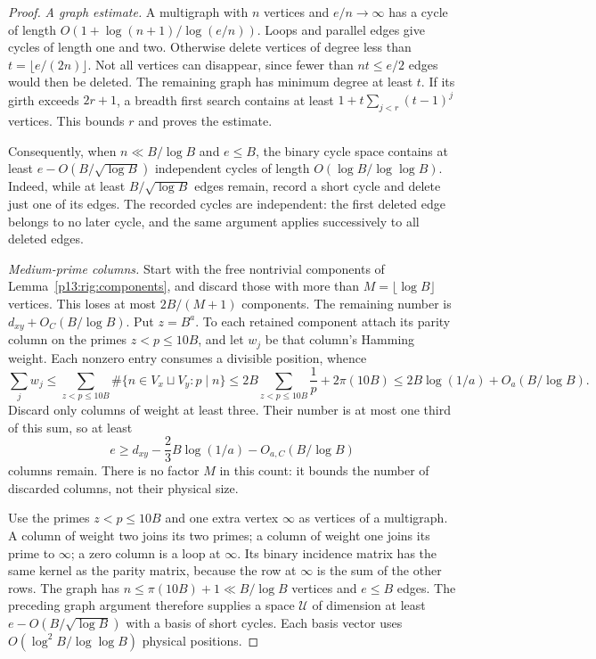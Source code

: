 \begin{proof}
\emph{A graph estimate.}
A multigraph with $n$ vertices and $e/n\to\infty$ has a cycle
of length $O(1+\log(n+1)/\log(e/n))$.  Loops and parallel
edges give cycles of length one and two.  Otherwise delete
vertices of degree less than $t=\lfloor e/(2n)\rfloor$.
Not all vertices can disappear, since fewer than $nt\le e/2$
edges would then be deleted.  The remaining graph has minimum
degree at least $t$.  If its girth exceeds $2r+1$, a breadth
first search contains at least
$1+t\sum_{j<r}(t-1)^j$ vertices.  This bounds $r$ and proves
the estimate.

Consequently, when $n\ll B/\log B$ and $e\le B$, the binary
cycle space contains at least $e-O(B/\sqrt{\log B})$
independent cycles of length $O(\log B/\log\log B)$.
Indeed, while at least $B/\sqrt{\log B}$ edges remain,
record a short cycle and delete just one of its edges.
The recorded cycles are independent: the first deleted edge
belongs to no later cycle, and the same argument applies
successively to all deleted edges.

\emph{Medium-prime columns.}
Start with the free nontrivial components of
Lemma~\ref{p13:rig:components}, and discard those with more
than $M=\lfloor\log B\rfloor$ vertices.  This loses at most
$2B/(M+1)$ components.  The remaining number is
$d_{xy}+O_C(B/\log B)$.  Put $z=B^a$.  To each retained
component attach its parity column on the primes $z<p\le10B$,
and let $w_j$ be that column's Hamming weight.  Each nonzero
entry consumes a divisible position, whence
\[
 \sum_j w_j
 \le\sum_{z<p\le10B}\#\{n\in V_x\sqcup V_y:p\mid n\}
 \le2B\sum_{z<p\le10B}\frac1p+2\pi(10B)
 \le2B\log(1/a)+O_a(B/\log B).
\]
Discard only columns of weight at least three.  Their number
is at most one third of this sum, so at least
\[
                 e\ge d_{xy}-\frac23B\log(1/a)
                                   -O_{a,C}(B/\log B)
\]
columns remain.  There is no factor $M$ in this count: it
bounds the number of discarded columns, not their physical size.

Use the primes $z<p\le10B$ and one extra vertex $\infty$
as vertices of a multigraph.  A column of weight two joins its
two primes; a column of weight one joins its prime to $\infty$;
a zero column is a loop at $\infty$.  Its binary incidence
matrix has the same kernel as the parity matrix, because the
row at $\infty$ is the sum of the other rows.  The graph has
$n\le\pi(10B)+1\ll B/\log B$ vertices and $e\le B$ edges.
The preceding graph argument therefore supplies a space
$\mathcal U$ of dimension at least
$e-O(B/\sqrt{\log B})$ with a basis of short cycles.
Each basis vector uses
$O(\log^2 B/\log\log B)$ physical positions.


\end{proof}
